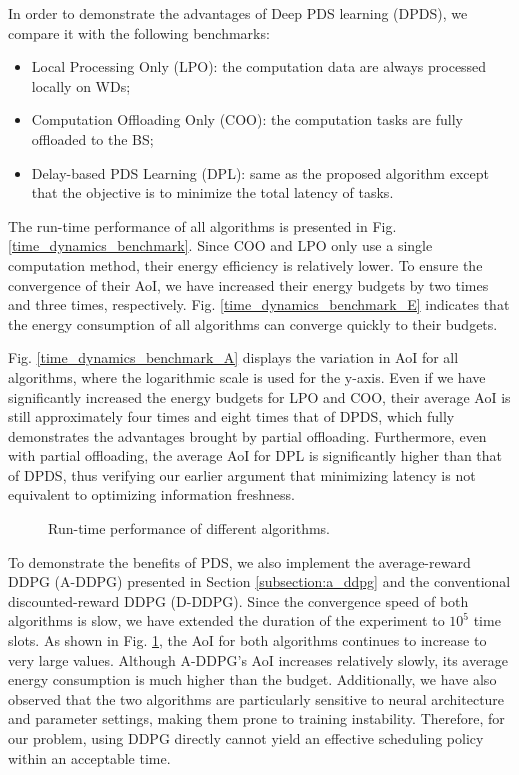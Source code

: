 \documentclass[lettersize, journal]{IEEEtran}
\begin{document}
In order to demonstrate the advantages of Deep PDS learning (DPDS), we compare it with the following benchmarks:
\begin{itemize}
    \item Local Processing Only (LPO): the computation data are always processed locally on WDs;
    \item Computation Offloading Only (COO): the computation tasks are fully offloaded to the BS;
    \item Delay-based PDS Learning (DPL): same as the proposed algorithm except that the objective is to minimize the total latency of tasks.
\end{itemize}
The run-time performance of all algorithms is presented in Fig. \ref{time_dynamics_benchmark}.
Since COO and LPO only use a single computation method, their energy efficiency is relatively lower. 
To ensure the convergence of their AoI, we have increased their energy budgets by two times and three times, respectively.
Fig. \ref{time_dynamics_benchmark_E} indicates that the energy consumption of all algorithms can converge quickly to their budgets.

Fig. \ref{time_dynamics_benchmark_A} displays the variation in AoI for all algorithms,
where the logarithmic scale is used for the y-axis.
Even if we have significantly increased the energy budgets for LPO and COO,
their average AoI is still approximately four times and eight times that of DPDS,
which fully demonstrates the advantages brought by partial offloading.
Furthermore, even with partial offloading, the average AoI for DPL is significantly higher than that of DPDS, 
thus verifying our earlier argument that minimizing latency is not equivalent to optimizing information freshness.

\begin{figure}[t]
\centering
{}
\vfil
{}
\caption{Run-time performance of different algorithms.}
\label{fig:sim_ddpg}
\end{figure}
To demonstrate the benefits of PDS, we also implement the average-reward DDPG (A-DDPG) presented in Section \ref{subsection:a_ddpg}
and the conventional discounted-reward DDPG (D-DDPG).
Since the convergence speed of both algorithms is slow, we have extended the duration of the experiment to $10^5$ time slots.
As shown in Fig. \ref{fig:sim_ddpg}, the AoI for both algorithms continues to increase to very large values.
Although A-DDPG's AoI increases relatively slowly, its average energy consumption is much higher than the budget.
Additionally, we have also observed that the two algorithms are particularly sensitive to neural architecture and parameter settings, 
making them prone to training instability.
Therefore, for our problem, using DDPG directly cannot yield an effective scheduling policy within an acceptable time.
\end{document}
